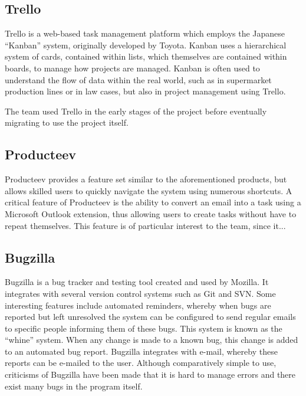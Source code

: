 \documentclass[a4paper]{l3proj}
\begin{document}
  \subsection{Trello}
  \label{trello}
  
  Trello is a web-based task management platform which employs the Japanese ``Kanban''
  system, originally developed by Toyota. Kanban uses a hierarchical system of
  cards, contained within lists, which themselves are contained within boards, to
  manage how projects are managed. Kanban is often used to understand the flow of data within the real world, such as in supermarket production lines or in law cases, but also in project management using Trello.

  The team used Trello in the early stages of the project before eventually migrating to use the project itself.

  \subsection{Producteev}
  \label{producteev}

  Producteev provides a feature set similar to the aforementioned products, but allows skilled users to quickly navigate the system using numerous shortcuts. A critical feature of Producteev is the ability to convert an email into a task using a Microsoft Outlook extension, thus allowing users to create tasks without have to repeat themselves. This feature is of particular interest to the team, since it... 

  \subsection{Bugzilla}
  \label{bugzilla}

  Bugzilla is a bug tracker and testing tool created and used by Mozilla. It integrates with several version control systems such as Git and SVN.  Some interesting features include automated reminders, whereby when bugs are reported but left unresolved the system can be configured to send regular emails to specific people informing them of these bugs. This system is known as the ``whine'' system.  When any change is made to a known bug, this change is added to an automated bug report.  Bugzilla integrates with e-mail, whereby these reports can be e-mailed to the user. Although comparatively simple to use, criticisms of Bugzilla have been made that it is hard to manage errors and there exist many bugs in the program itself.
\end{document}
